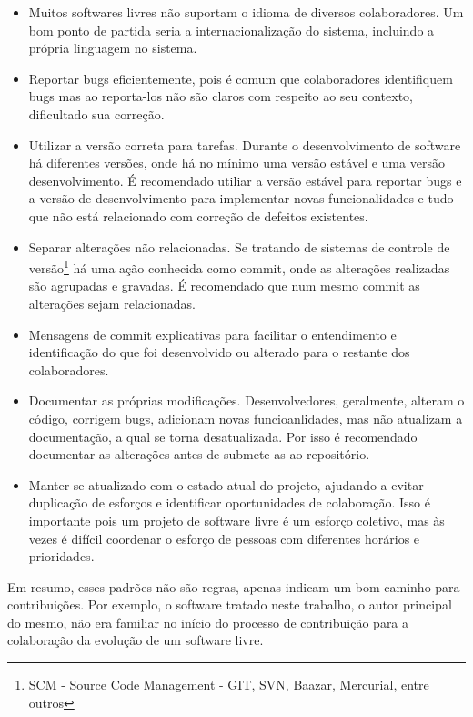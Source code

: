 \begin{itemize}
\begin{itemize}
		\item Muitos softwares livres não suportam o idioma de diversos colaboradores. Um bom ponto de partida seria a internacionalização do sistema, incluindo a própria linguagem no sistema.

		\item Reportar bugs eficientemente, pois é comum que colaboradores identifiquem bugs mas ao reporta-los não são claros com respeito ao seu contexto, dificultado sua correção.

		\item Utilizar a versão correta para tarefas. Durante o desenvolvimento de software há diferentes versões, onde há no mínimo uma versão estável e uma versão desenvolvimento. É recomendado utiliar a versão estável para reportar bugs e a versão de desenvolvimento para implementar novas funcionalidades e tudo que não está relacionado com correção de defeitos existentes.

		\item Separar alterações não relacionadas. Se tratando de sistemas de controle de versão\footnote{SCM - Source Code Management - GIT, SVN, Baazar, Mercurial, entre outros} há uma ação conhecida como commit, onde as alterações realizadas são agrupadas e gravadas. É recomendado que num mesmo commit as alterações sejam relacionadas.

		\item Mensagens de commit explicativas para facilitar o entendimento e identificação do que foi desenvolvido ou alterado para o restante dos colaboradores.

		\item Documentar as próprias modificações. Desenvolvedores, geralmente, alteram o código, corrigem bugs, adicionam novas funcioanlidades, mas não atualizam a documentação, a qual se torna desatualizada. Por isso é recomendado documentar as alterações antes de submete-as ao repositório.

		\item Manter-se atualizado com o estado atual do projeto, ajudando a evitar duplicação de esforços e identificar oportunidades de colaboração. Isso é importante pois um projeto de software livre é um esforço coletivo, mas às vezes é difícil coordenar o esforço de pessoas com diferentes horários e prioridades.

	\end{itemize}

\end{itemize}


Em resumo, esses padrões não são regras, apenas indicam um bom caminho para contribuições. Por exemplo, o software tratado neste trabalho, o autor principal do mesmo, não era familiar no início do processo de contribuição para a colaboração da evolução de um software livre.

